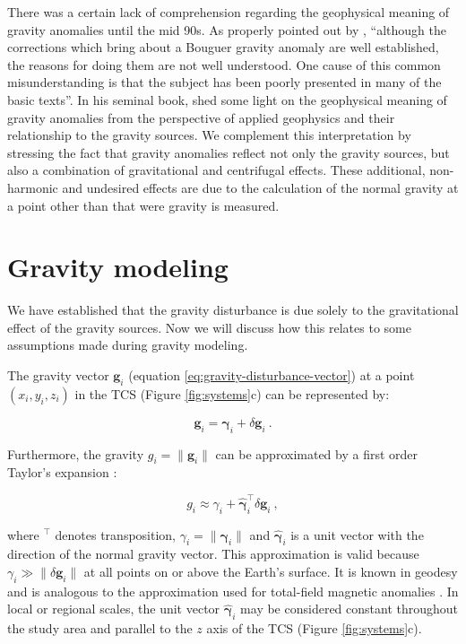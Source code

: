 \documentclass[manuscript]{geophysics}
\begin{document}
There was a certain lack of comprehension regarding the geophysical meaning of
gravity anomalies until the mid 90s.
As properly pointed out by \citet{chapin1996},
``although the corrections which bring about a Bouguer gravity anomaly are well
established, the reasons for doing them are not well understood. One cause of
this common misunderstanding is that the subject has been poorly presented in
many of the basic texts''.
In his seminal book, \citet{blakely1996} shed some light on the geophysical
meaning of gravity anomalies from the perspective of applied geophysics and
their relationship to the gravity sources.
We complement this interpretation by stressing the fact that
gravity anomalies reflect not only the gravity sources,
but also a combination of gravitational and centrifugal effects.
These additional, non-harmonic and undesired effects are due to the calculation
of the normal gravity at a point other than that were gravity is measured.


\section{Gravity modeling}

We have established that the gravity disturbance is due solely to the
gravitational effect of the gravity sources.
Now we will discuss how this relates to some assumptions made during gravity
modeling.

The gravity vector $\mathbf{g}_i$ (equation \ref{eq:gravity-disturbance-vector})
at a point $(x_i, y_i, z_i)$ in the TCS (Figure \ref{fig:systems}c) can be
represented by:

\begin{equation}
\mathbf{g}_i = \boldsymbol{\gamma}_i + \delta \mathbf{g}_i \: .
\label{eq:gravity-vector-TCS}
\end{equation}

\noindent
Furthermore, the gravity $g_i = \| \mathbf{g}_i \|$ can be approximated by a first order Taylor's
expansion \citep{sanso_sideris2013}:

\begin{equation}
g_i \approx \gamma_i +
\hat{\boldsymbol{\gamma}}_i^{\top} \delta \mathbf{g}_i \: ,
\label{eq:gobs-approx}
\end{equation}

\noindent
where $^{\top}$ denotes transposition, $\gamma_i = \| \boldsymbol{\gamma}_i \|$ 
and $\hat{\boldsymbol{\gamma}}_{i}$ is a unit
vector with the direction of the normal gravity vector.
This approximation is valid because
$\gamma_{i} \gg \| \delta \mathbf{g}_{i} \|$ at all points on or above the
Earth's surface.
It is known in geodesy \citep[e.g.,][]{sanso_sideris2013}
and is analogous to the approximation used for
total-field magnetic anomalies \citep[e.g.,][]{blakely1996}.
In local or regional scales, the unit
vector $\hat{\boldsymbol{\gamma}}_{i}$
may be considered constant throughout the study area and
parallel to the $z$ axis of the TCS (Figure \ref{fig:systems}c).
\end{document}
